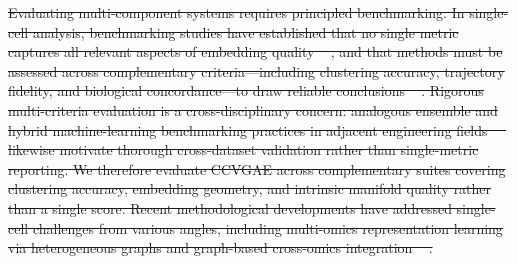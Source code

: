\documentclass[referee, pdflatex, sn-vancouver-num]{sn-jnl}
\providecommand{\DIFdeltex}[1]{{\protect\color{red}\sout{#1}}}                      %
\providecommand{\DIFdel}[1]{\texorpdfstring{\DIFdeltex{#1}}{}} %
\begin{document}
\DIFdel{Evaluating multi-component systems requires principled benchmarking. In single-cell analysis, benchmarking studies have established that no single metric captures all relevant aspects of embedding quality \mbox{%
\cite{luecken2022benchmarking}}\hskip0pt%
, and that methods must be assessed across complementary criteria---including clustering accuracy, trajectory fidelity, and biological concordance---to draw reliable conclusions \mbox{%
\cite{ma2020single,stuart2019integrative}}\hskip0pt%
. Rigorous multi-criteria evaluation is a cross-disciplinary concern: analogous ensemble and hybrid machine-learning benchmarking practices in adjacent engineering fields \mbox{%
\cite{naeem2025ensemble,naeem2025hybrid,naser2025seismic} }\hskip0pt%
likewise motivate thorough cross-dataset validation rather than single-metric reporting. We therefore evaluate CCVGAE across complementary suites covering clustering accuracy, embedding geometry, and intrinsic manifold quality rather than a single score. Recent methodological developments have addressed single-cell challenges from various angles, including multi-omics representation learning via heterogeneous graphs and graph-based cross-omics integration \mbox{%
\cite{li2024moh,cao2022glue}}\hskip0pt%
. }%
\end{document}
